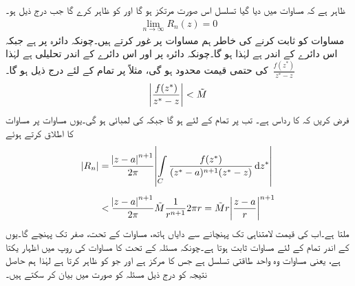 ظاہر ہے کہ مساوات  میں دیا گیا تسلسل اس صورت مرتکز ہو گا اور  کو ظاہر کرے گا جب درج ذیل ہو۔
\begin{align}\label{مساوات_ٹیلر_کوشی_کلیہ_تکمل_ٹیلر_چ}
\lim_{n\to\infty} R_n(z)=0
\end{align}
مساوات  کو ثابت کرنے کی خاطر ہم مساوات  پر غور کرتے ہیں۔چونکہ  دائرہ  پر ہے جبکہ  اس دائرے کے اندر ہے لہٰذا  ہو گا۔چونکہ  دائرہ  پر اور اس دائرے کے اندر تحلیلی ہے لہٰذا 
$\,\tfrac{f(z^*)}{z^*-z}\,$
کی حتمی قیمت محدود ہو گی، مثلاً  پر تمام  کے لئے درج ذیل ہو گا۔ 
\begin{align*}
\abs{\frac{f(z^*)}{z^*-z}}<\tilde{M}
\end{align*}
فرض کریں کہ  کا رداس  ہے۔ تب  پر تمام  کے لئے   ہو گا جبکہ  کی لمبائی  ہو گی۔یوں مساوات  پر مساوات  کا اطلاق کرتے ہوئے 
\begin{align*}
\abs{R_n}&=\frac{\abs{z-a}^{n+1}}{2\pi}\abs{\int\limits_C \frac{f(z^*)}{(z^*-a)^{n+1}(z^*-z)}\dif z^*}\\[0.5em]
&<\frac{\abs{z-a}^{n+1}}{2\pi} \tilde{M}\frac{1}{r^{n+1}}2\pi r=\tilde{M} r\abs{\frac{z-a}{r}}^{n+1}
\end{align*}
ملتا ہے۔اب  کی قیمت لامتناہی تک پہنچانے سے دایاں ہاتھ، مساوات  کے تحت، صفر تک پہنچے گا۔یوں   کے اندر تمام  کے لئے مساوات  ثابت ہوتا ہے۔چونکہ مسئلہ  کے تحت  کا مساوات  کی روپ میں اظہار یکتا ہے، یعنی مساوات  وہ واحد طاقتی تسلسل ہے جس کا مرکز  ہے اور جو  کو ظاہر کرتا ہے لہٰذا ہم حاصل نتیجہ کو درج ذیل مسئلہ کو صورت میں بیان کر سکتے ہیں۔

